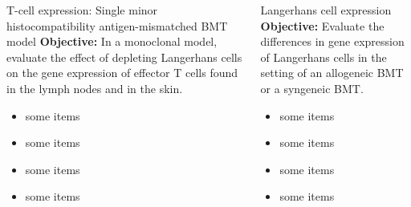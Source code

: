 \documentclass[final,hyperref={pdfpagelabels=false}]{beamer}
\begin{document}
\begin{frame}{}
\begin{columns}[t]
      \begin{column}{.25\linewidth}
        \begin{block}{T-cell expression: Single minor histocompatibility antigen-mismatched BMT model}
	  {\bf Objective:} In a monoclonal model, evaluate the effect of depleting Langerhans cells on the gene expression of effector T cells found in the lymph nodes and in the skin.
          \begin{itemize}
          \item some items
          \item some items
          \item some items
          \item some items
          \end{itemize}
        \end{block}
      \end{column}


      \begin{column}{.25\linewidth}
        \begin{block}{Langerhans cell expression}
	  {\bf Objective:} Evaluate the differences in gene expression of Langerhans cells in the setting of an allogeneic BMT or a syngeneic BMT.
          \begin{itemize}
          \item some items
          \item some items
          \item some items
          \item some items
          \end{itemize}
        \end{block}
      \end{column}


    \end{columns}
  \end{frame}
\end{document}
